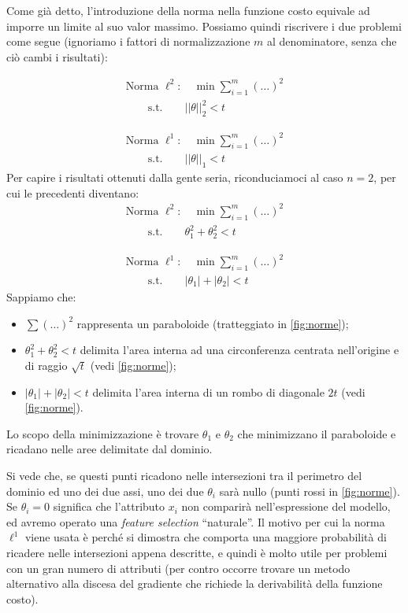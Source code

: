 Come già detto, l'introduzione della norma nella funzione costo equivale ad imporre un limite al suo valor massimo. Possiamo quindi riscrivere i due problemi come segue (ignoriamo i fattori di normalizzazione $m$ al denominatore, senza che ciò cambi i risultati):

\begin{gather}
\text{Norma }\ell^2:
\quad \min\sum_{i=1}^m(\dots)^2 \\
\qquad \text{s.t.} \qquad ||\theta||_2^2 < t
\end{gather}
 
 \begin{gather}
\text{Norma }\ell^1:
\quad \min\sum_{i=1}^m(\dots)^2 \\
\qquad \text{s.t.} \qquad ||\theta||_1 < t
\end{gather}
Per capire i risultati ottenuti dalla gente seria, riconduciamoci al caso $n=2$, per cui le precedenti diventano:
\begin{gather}
\text{Norma }\ell^2:
\quad \min\sum_{i=1}^m(\dots)^2 \\
\qquad \text{s.t.} \qquad \theta_1^2 + \theta_2^2 < t
\end{gather}
 
 \begin{gather}
\text{Norma }\ell^1:
\quad \min\sum_{i=1}^m(\dots)^2 \\
\qquad \text{s.t.} \qquad |\theta_1|+|\theta_2| < t
\end{gather}
Sappiamo che:
\begin{itemize}
\item $\sum(\dots)^2$ rappresenta un paraboloide (tratteggiato in \autoref{fig:norme});
\item $\theta_1^2 + \theta_2^2 < t$ delimita l'area interna ad una circonferenza centrata nell'origine e di raggio $\sqrt{t}$ (vedi \autoref{fig:norme});
\item $|\theta_1|+|\theta_2| < t$ delimita l'area interna di un rombo di diagonale $2t$ (vedi \autoref{fig:norme}).
\end{itemize}
Lo scopo della minimizzazione è trovare $\theta_1$ e $\theta_2$ che minimizzano il paraboloide e ricadano nelle aree delimitate dal dominio. 



Si vede che, se questi punti ricadono nelle intersezioni tra il perimetro del dominio ed uno dei due assi, uno dei due $\theta_i$ sarà nullo (punti rossi in \autoref{fig:norme}). Se $\theta_i=0$ significa che l'attributo $x_i$ non comparirà nell'espressione del modello, ed avremo operato una \emph{feature selection} ``naturale''. Il motivo per cui la norma $\ell^1$ viene usata è perché si dimostra che comporta una maggiore probabilità di ricadere nelle intersezioni appena descritte, e quindi è molto utile per problemi con un gran numero di attributi (per contro occorre trovare un metodo alternativo alla discesa del gradiente che richiede la derivabilità della funzione costo).


